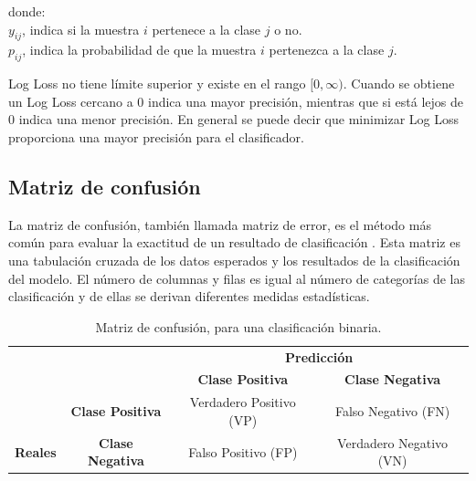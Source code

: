 donde:
\\
$y_{ij}$, indica si la muestra $i$ pertenece a la clase $j$ o no.\\
$p_{ij}$, indica la probabilidad de que la muestra $i$ pertenezca a la clase $j$.

\vspace{5mm} %

Log Loss no tiene l\'{i}mite superior y existe en el rango $[0, \infty )$. Cuando se obtiene un Log Loss cercano a 0 indica una mayor precisi\'{o}n, mientras que si est\'{a} lejos de 0 indica una menor precisi\'{o}n. En general se puede decir que minimizar Log Loss proporciona una mayor precisi\'{o}n para el clasificador.

\subsection{Matriz de confusi\'{o}n}

La matriz de confusi\'{o}n, tambi\'{e}n llamada matriz de error, es el m\'{e}todo m\'{a}s com\'{u}n para evaluar la exactitud de un resultado de clasificaci\'{o}n \cite{61}. Esta matriz es una tabulaci\'{o}n cruzada de los datos esperados y los resultados de la clasificaci\'{o}n del modelo. El n\'{u}mero de columnas y filas es igual al n\'{u}mero de categor\'{i}as de las clasificaci\'{o}n y de ellas se derivan diferentes medidas estad\'{i}sticas.

\begin{table}[H]

\centering
\begin{center}
\begin{tabular}{ll|c|c|}
\cline{3-4}
                                                        &                                              & \multicolumn{2}{c|}{\textbf{Predicci\'{o}n}}                                                          \\ \cline{3-4} 
                                                        &                                              & \textbf{Clase Positiva}                         & \textbf{Clase Negativa}                         \\ \hline
\multicolumn{1}{|c|}{}                                  & \multicolumn{1}{c|}{\textbf{Clase Positiva}} & \cellcolor[HTML]{AADD99}Verdadero Positivo (VP) & \cellcolor[HTML]{FFCE93}Falso Negativo (FN)     \\ \cline{2-4} 
\multicolumn{1}{|c|}{\multirow{-2}{*}{\textbf{Reales}}} & \multicolumn{1}{c|}{\textbf{Clase Negativa}} & \cellcolor[HTML]{DF9F9F}Falso Positivo (FP)     & \cellcolor[HTML]{AADD99}Verdadero Negativo (VN) \\ \hline
\end{tabular}
\caption{Matriz de confusi\'{o}n, para una clasificaci\'{o}n binaria.}
\label{table:matriz}
\end{center}
\end{table}

